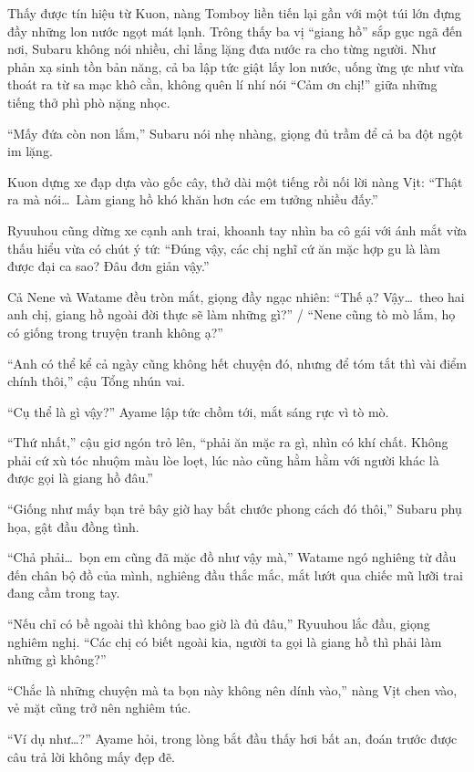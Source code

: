 \documentclass[../main.tex]{subfiles}
\begin{document}
Thấy được tín hiệu từ Kuon, nàng Tomboy liền tiến lại gần với một túi lớn đựng đầy những lon nước ngọt mát lạnh. Trông thấy ba vị ``giang hồ'' sắp gục ngã đến nơi, Subaru không nói nhiều, chỉ lẳng lặng đưa nước ra cho từng người. Như phản xạ sinh tồn bản năng, cả ba lập tức giật lấy lon nước, uống ừng ực như vừa thoát ra từ sa mạc khô cằn, không quên lí nhí nói ``Cảm ơn chị!'' giữa những tiếng thở phì phò nặng nhọc.


``Mấy đứa còn non lắm,'' Subaru nói nhẹ nhàng, giọng đủ trầm để cả ba đột ngột im lặng.

Kuon dựng xe đạp dựa vào gốc cây, thở dài một tiếng rồi nối lời nàng Vịt: ``Thật ra mà nói\dots\ Làm giang hồ khó khăn hơn các em tưởng nhiều đấy.''

Ryuuhou cũng dừng xe cạnh anh trai, khoanh tay nhìn ba cô gái với ánh mắt vừa thấu hiểu vừa có chút ý tứ: ``Đúng vậy, các chị nghĩ cứ ăn mặc hợp gu là làm được đại ca sao? Đâu đơn giản vậy.''

Cả Nene và Watame đều tròn mắt, giọng đầy ngạc nhiên: ``Thế ạ? Vậy\dots\ theo hai anh chị, giang hồ ngoài đời thực sẽ làm những gì?'' / ``Nene cũng tò mò lắm, họ có giống trong truyện tranh không ạ?''

``Anh có thể kể cả ngày cũng không hết chuyện đó, nhưng để tóm tắt thì vài điểm chính thôi,'' cậu Tổng nhún vai.

``Cụ thể là gì vậy?'' Ayame lập tức chồm tới, mắt sáng rực vì tò mò.

``Thứ nhất,'' cậu giơ ngón trỏ lên, ``phải ăn mặc ra gì, nhìn có khí chất. Không phải cứ xù tóc nhuộm màu lòe loẹt, lúc nào cũng hằm hằm với người khác là được gọi là giang hồ đâu.''

``Giống như mấy bạn trẻ bây giờ hay bắt chước phong cách đó thôi,'' Subaru phụ họa, gật đầu đồng tình.

``Chả phải\dots\ bọn em cũng đã mặc đồ như vậy mà,'' Watame ngó nghiêng từ đầu đến chân bộ đồ của mình, nghiêng đầu thắc mắc, mắt lướt qua chiếc mũ lưỡi trai đang cầm trong tay.

``Nếu chỉ có bề ngoài thì không bao giờ là đủ đâu,'' Ryuuhou lắc đầu, giọng nghiêm nghị. ``Các chị có biết ngoài kia, người ta gọi là giang hồ thì phải làm những gì không?''

``Chắc là những chuyện mà ta bọn này không nên dính vào,'' nàng Vịt chen vào, vẻ mặt cũng trở nên nghiêm túc.

``Ví dụ như\dots?'' Ayame hỏi, trong lòng bắt đầu thấy hơi bất an, đoán trước được câu trả lời không mấy đẹp đẽ.
\end{document}
